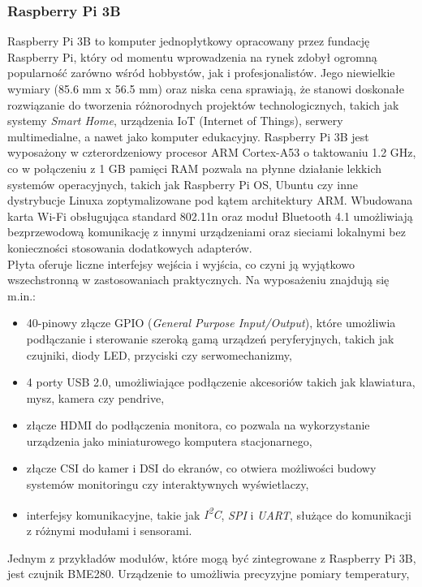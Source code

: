 \documentclass[12pt]{article}
\begin{document}
\subsubsection{Raspberry Pi 3B}
Raspberry Pi 3B to komputer jednopłytkowy opracowany przez fundację Raspberry Pi, który od momentu wprowadzenia na rynek zdobył ogromną popularność zarówno wśród hobbystów,
jak i profesjonalistów. Jego niewielkie wymiary (85.6 mm x 56.5 mm) oraz niska cena sprawiają,
że stanowi doskonałe rozwiązanie do tworzenia różnorodnych projektów technologicznych, takich jak systemy \textit{Smart Home},
urządzenia IoT (Internet of Things), serwery multimedialne, a nawet jako komputer edukacyjny.
Raspberry Pi 3B jest wyposażony w czterordzeniowy procesor ARM Cortex-A53 o taktowaniu 1.2 GHz, co w połączeniu z 1 GB pamięci RAM
pozwala na płynne działanie lekkich systemów operacyjnych, takich jak Raspberry Pi OS, Ubuntu czy inne dystrybucje Linuxa zoptymalizowane pod kątem architektury ARM.
Wbudowana karta Wi-Fi obsługująca standard 802.11n oraz moduł Bluetooth 4.1 umożliwiają bezprzewodową komunikację z innymi urządzeniami
oraz sieciami lokalnymi bez konieczności stosowania dodatkowych adapterów.\\
Płyta oferuje liczne interfejsy wejścia i wyjścia, co czyni ją wyjątkowo wszechstronną w zastosowaniach praktycznych. Na wyposażeniu znajdują się m.in.:
\begin{itemize}
    \item 40-pinowy złącze GPIO (\textit{General Purpose Input/Output}), które umożliwia podłączanie i sterowanie szeroką gamą urządzeń peryferyjnych,
	takich jak czujniki, diody LED, przyciski czy serwomechanizmy,
    \item 4 porty USB 2.0, umożliwiające podłączenie akcesoriów takich jak klawiatura, mysz, kamera czy pendrive,
    \item złącze HDMI do podłączenia monitora, co pozwala na wykorzystanie urządzenia jako miniaturowego komputera stacjonarnego,
    \item złącze CSI do kamer i DSI do ekranów, co otwiera możliwości budowy systemów monitoringu czy interaktywnych wyświetlaczy,
    \item interfejsy komunikacyjne, takie jak \textit{I\textsuperscript{2}C}, \textit{SPI} i \textit{UART}, służące do komunikacji z różnymi modułami i sensorami.
\end{itemize}
Jednym z przykładów modułów, które mogą być zintegrowane z Raspberry Pi 3B, jest czujnik BME280. Urządzenie to umożliwia precyzyjne pomiary temperatury,
\end{document}
